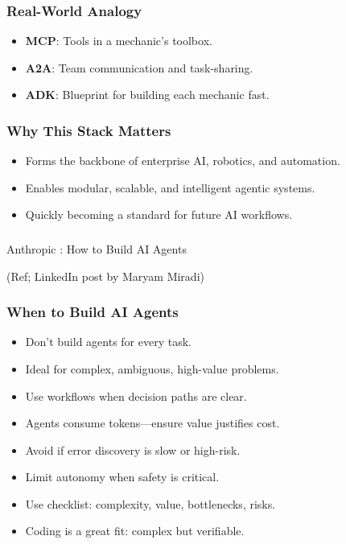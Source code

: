 \begin{frame}[fragile]\frametitle{Real-World Analogy}
    \begin{itemize}
        \item \textbf{MCP}: Tools in a mechanic's toolbox.
        \item \textbf{A2A}: Team communication and task-sharing.
        \item \textbf{ADK}: Blueprint for building each mechanic fast.
    \end{itemize}
\end{frame}

\begin{frame}[fragile]\frametitle{Why This Stack Matters}
    \begin{itemize}
        \item Forms the backbone of enterprise AI, robotics, and automation.
        \item Enables modular, scalable, and intelligent agentic systems.
        \item Quickly becoming a standard for future AI workflows.
    \end{itemize}
\end{frame}


\begin{frame}[fragile]\frametitle{}
\begin{center}
{\Large Anthropic :  How to Build AI Agents}

{\tiny (Ref; LinkedIn post by Maryam Miradi)}
\end{center}
\end{frame}

\begin{frame}[fragile]\frametitle{When to Build AI Agents}
    \begin{itemize}
        \item Don’t build agents for every task.
        \item Ideal for complex, ambiguous, high-value problems.
        \item Use workflows when decision paths are clear.
        \item Agents consume tokens—ensure value justifies cost.
        \item Avoid if error discovery is slow or high-risk.
        \item Limit autonomy when safety is critical.
        \item Use checklist: complexity, value, bottlenecks, risks.
        \item Coding is a great fit: complex but verifiable.
    \end{itemize}
\end{frame}

